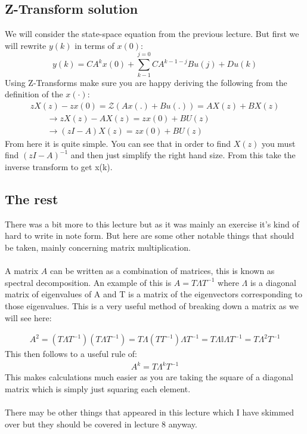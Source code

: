 \documentclass[a4paper,11pt]{article}
\begin{document}
\subsection{Z-Transform solution}
We will consider the state-space equation from the previous lecture. But first we will rewrite $y(k)$ in terms of $x(0)$:
\begin{equation}
    y(k) = CA^kx(0)+\sum\limits_{k-1}^{j=0}CA^{k-1-j}Bu(j) + Du(k)  
\end{equation}
Using Z-Transforms make sure you are happy deriving the following from the definition of the $x(\cdot)$:
\begin{gather}
	zX(z) - zx(0) = \mathcal{Z}(Ax(.)+Bu(.))= AX(z)+BX(z)\\
	\qquad \rightarrow zX(z)-AX(z)=zx(0)+BU(z)\\
	\qquad \rightarrow (zI - A)X(z)= zx(0)+BU(z)
\end{gather}
From here it is quite simple. You can see that in order to find $X(z)$ you must find $(zI-A)^{-1}$ and then just simplify the right hand size. From this take the inverse transform to get x(k).
\subsection{The rest}
	There was a bit more to this lecture but as it was mainly an exercise it's kind of hard to write in note form. But here are some other notable things that should be taken, mainly concerning matrix multiplication.\\\\
	A matrix $A$ can be written as a combination of matrices, this is known as spectral decomposition. An example of this is $A=T\Lambda T^{-1}$ where $\Lambda$ is a diagonal matrix of eigenvalues of A and T is a matrix of the eigenvectors corresponding to those eigenvalues. This is a very useful method of breaking down a matrix as we will see here: 

	\begin{gather}
		A^2=(T\Lambda T^{-1})(T\Lambda T^{-1})=T\Lambda (TT^{-1})\Lambda T^{-1}=T\Lambda \mathbb{I}\Lambda T^{-1} = T\Lambda^2T^{-1}
	\end{gather}
	This then follows to a useful rule of:
	\begin{gather}
		A^k=T\Lambda^kT^{-1}
	\end{gather}
	This makes calculations much easier as you are taking the square of a diagonal matrix which is simply just squaring each element.\\\\
	There may be other things that appeared in this lecture which I have skimmed over but they should be covered in lecture 8 anyway.
\end{document}
